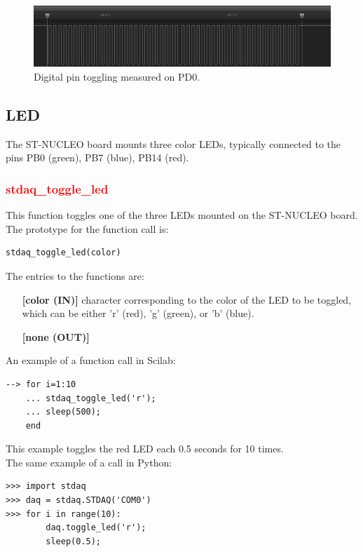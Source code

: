 \documentclass[letterpaper,10pt,english]{hitec}
\begin{document}
\begin{figure}[ht!]
\includegraphics[scale=0.8]{../img/gpio_example.png}
\caption{Digital pin toggling measured on PD0.}
\label{fig:gpio_example}
\end{figure}


\hrulefill

\subsection{LED}

The ST-NUCLEO board mounts three color LEDs, typically connected to the pins PB0 (green), PB7 (blue), PB14 (red).

\subsubsection{\textcolor{red}{stdaq\_toggle\_led}}
This function toggles one of the three LEDs mounted on the ST-NUCLEO board.
The prototype for the function call is: 
\begin{verbatim}
stdaq_toggle_led(color)
\end{verbatim}
The entries to the functions are:
\begin{itemize}
\item [\textbf{[color (IN)]}] character corresponding to the color of the LED to be toggled, which can be either 'r' (red), 'g' (green), or 'b' (blue).
\item [\textbf{[none (OUT)]}]
\end{itemize}
An example of a function call in Scilab:
\begin{verbatim}
--> for i=1:10
    ... stdaq_toggle_led('r');
    ... sleep(500);
    end
\end{verbatim}
This example toggles the red LED each 0.5 seconds for 10 times. \\
The same example of a call in Python:
\begin{verbatim}
>>> import stdaq
>>> daq = stdaq.STDAQ('COM0')
>>> for i in range(10):
        daq.toggle_led('r');
        sleep(0.5);
\end{verbatim}

\hrulefill
\end{document}
